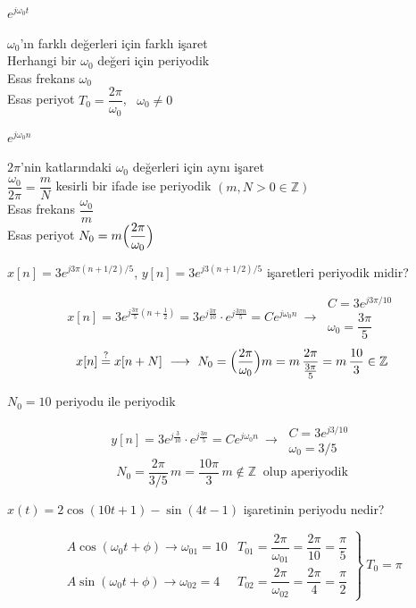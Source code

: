 \documentclass[11pt,a4paper]{article}
\begin{document}
\noindent
\begin{minipage}[t]{0.44\linewidth}
  \underline{$e^{j\omega_0t}$}\par\smallskip
  $\omega_0$'ın farklı değerleri için farklı işaret\\[1mm]
  Herhangi bir $\omega_0$ değeri için periyodik\\[1mm]
  Esas frekans $\omega_0$\\[2mm]
  Esas periyot $T_0=\dfrac{2\pi}{\omega_0}$, \ $\omega_0\neq0$
\end{minipage}\hfill
\begin{minipage}[t]{0.53\linewidth}
  \underline{$e^{j\omega_0n}$}\par\smallskip
  $2\pi$'nin katlarındaki $\omega_0$ değerleri için aynı işaret\\[1mm]
  $\dfrac{\omega_0}{2\pi}=\dfrac{m}{N}$ kesirli bir ifade ise periyodik $(m,N>0\in\mathbb{Z})$\\[1mm]
  Esas frekans $\dfrac{\omega_0}{m}$\\[1mm]
  Esas periyot $N_0=m\Bigl(\dfrac{2\pi}{\omega_0}\Bigr)$
\end{minipage}

\begin{ornek}[]
  $x[n]=3e^{j3\pi(n+1/2)/5}$, \quad $y[n]=3e^{j3(n+1/2)/5}$ \quad işaretleri periyodik midir?
\end{ornek}
\begin{cozum}
  \[
    x[n]=3e^{j\frac{3\pi}{5}(n+\frac12)}=3e^{j\frac{3\pi}{10}}\cdot e^{j\frac{3\pi n}{5}}=Ce^{j\omega_0n}
    \ \longrightarrow\
    \begin{array}{l} C=3e^{j3\pi/10}\\[1mm] \omega_0=\dfrac{3\pi}{5}\end{array}
  \]
  \[
    x[n]\overset{?}{=}x[n+N]\ \longrightarrow\ N_0=\Bigl(\frac{2\pi}{\omega_0}\Bigr)m=m\,\frac{2\pi}{\frac{3\pi}{5}}=m\,\frac{10}{3}\in\mathbb{Z}
  \]
  \begin{center} $N_0=10$ periyodu ile periyodik \end{center}
  \[
    y[n]=3e^{j\frac{3}{10}}\cdot e^{j\frac{3n}{5}}=Ce^{j\omega_0n}
    \ \longrightarrow\
    \begin{array}{l} C=3e^{j3/10}\\[1mm] \omega_0=3/5\end{array}
  \]
  \[
    N_0=\frac{2\pi}{3/5}\,m=\frac{10\pi}{3}\,m\notin\mathbb{Z}\ \text{ olup aperiyodik}
  \]
\end{cozum}

\begin{ornek}[]
  $x(t)=2\cos(10t+1)-\sin(4t-1)$ işaretinin periyodu nedir?
\end{ornek}
\begin{cozum}
  \[
    \left.
    \begin{array}{ll}
      A\cos(\omega_0t+\phi)\longrightarrow \omega_{01}=10 & T_{01}=\dfrac{2\pi}{\omega_{01}}=\dfrac{2\pi}{10}=\dfrac{\pi}{5}\\[4mm]
      A\sin(\omega_0t+\phi)\longrightarrow \omega_{02}=4 & T_{02}=\dfrac{2\pi}{\omega_{02}}=\dfrac{2\pi}{4}=\dfrac{\pi}{2}
    \end{array}
    \right\}\ T_0=\pi
  \]
\end{cozum}
\end{document}
